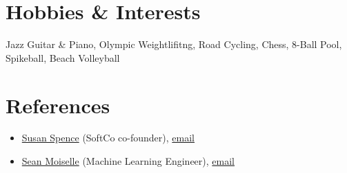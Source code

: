 \documentclass[letterpaper,11pt]{article}
\newcommand{\resumeSubHeadingListStart}{\begin{itemize}[leftmargin=0.15in, label={}]}
\newcommand{\resumeSubHeadingListEnd}{\end{itemize}}
\begin{document}






  \section{Hobbies \& Interests}
  \resumeSubHeadingListStart
  \small{\item{Jazz Guitar \& Piano, Olympic Weightlifitng, Road Cycling, Chess, 8-Ball Pool, Spikeball, Beach Volleyball}}
  \resumeSubHeadingListEnd



\section{References}
  \vspace{2pt}
  \resumeSubHeadingListStart
\item{\href{https://www.linkedin.com/in/susan-spence-08a3062/}{Susan Spence} (SoftCo co-founder), \href{susan.spence@manverton.com}{email}}
\item{\href{https://www.linkedin.com/in/sean-m-013b621b7?lipi=urn%3Ali%3Apage%3Ad_flagship3_profile_view_base_contact_details%3Bt%2FbCMsvDQSiQv36B4adOpA%3D%3D}{Sean Moiselle} (Machine Learning Engineer), \href{Seanmoiselle@gmail.com}{email}}
   \resumeSubHeadingListEnd



\end{document}
